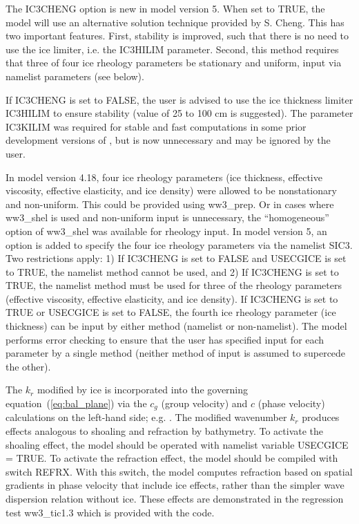 The {\code IC3CHENG} option is new in model version 5. When set to {\code TRUE}, the model will use an alternative solution technique provided by S. Cheng. This has two important features. First, stability is improved, such that there is no need to use the ice limiter, i.e. the {\code IC3HILIM} parameter. Second, this method requires that three of four ice rheology parameters be stationary and uniform, input via namelist parameters (see below).

If {\code IC3CHENG} is set to {\code FALSE}, the user is advised to use the ice thickness limiter {\code IC3HILIM} to ensure stability (value of 25 to 100 cm is suggested). The parameter {\code IC3KILIM} was required for stable and fast computations in some prior development versions of \ws, but is now unnecessary and may be ignored by the user.

In model version 4.18, four ice rheology parameters (ice thickness, effective viscosity, effective elasticity, and ice density) were allowed to be nonstationary and non-uniform. This could be provided using {\file ww3\_prep}. Or in cases where {\file ww3\_shel} is used and non-uniform input is unnecessary, the ``homogeneous'' option of {\file ww3\_shel} was available for rheology input. In model version 5, an option is added to specify the four ice rheology parameters via the namelist {\F SIC3}. Two restrictions apply: 1) If {\code IC3CHENG} is set to {\code FALSE} and  {\code USECGICE} is set to {\code TRUE}, the namelist method cannot be used, and 2) If {\code IC3CHENG} is set to {\code TRUE}, the namelist method must be used for three of the rheology parameters (effective viscosity, effective elasticity, and ice density). If {\code IC3CHENG} is set to {\code TRUE} or {\code USECGICE} is set to {\code FALSE}, the fourth ice rheology parameter (ice thickness) can be input by either method (namelist or non-namelist). The model performs error checking to ensure that the user has specified input for each parameter by a single method (neither method of input is assumed to supercede the other).

The ${k_r}$ modified by ice is incorporated into the governing
equation~(\ref{eq:bal_plane}) via the $c_g$ (group velocity) and $c$ (phase velocity) calculations on the
left-hand side; e.g. \citet[][and subsequent unpublished work]{art:RH09}.  The
modified wavenumber ${k_r}$ produces effects analogous to shoaling and
refraction by bathymetry. To activate the shoaling effect, the model should be
operated with namelist variable {\code USECGICE = TRUE}. To activate the refraction effect, the model should be
compiled with switch {\code REFRX}. With this switch, the model computes
refraction based on spatial gradients in phase velocity that include ice effects, rather than the
simpler wave dispersion relation without ice. These effects are demonstrated in the regression test {\file
ww3\_tic1.3} which is provided with the code.

